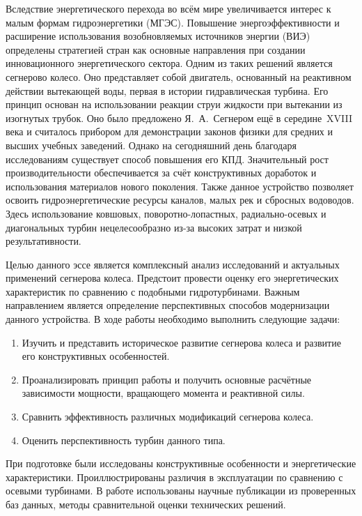 Вследствие энергетического перехода во всём мире увеличивается интерес к малым формам гидроэнергетики (МГЭС). 
Повышение энергоэффективности и расширение использования возобновляемых источников энергии (ВИЭ) определены стратегией стран
как основные направления при создании инновационного энергетического сектора. Одним из таких решений является сегнерово колесо.
Оно представляет собой двигатель, основанный на реактивном действии вытекающей воды, первая в истории гидравлическая турбина. 
Его принцип основан на использовании реакции струи жидкости при вытекании из изогнутых трубок. Оно было предложено 
Я.~А.~Сегнером ещё в середине~XVIII века и считалось прибором для демонстрации законов физики для средних и высших учебных заведений. 
Однако на сегодняшний день благодаря исследованиям существует способ повышения его КПД. Значительный рост производительности 
обеспечивается за счёт конструктивных доработок и использования материалов нового поколения. Также данное устройство позволяет 
освоить гидроэнергетические ресурсы каналов, малых рек и сбросных водоводов. Здесь использование ковшовых, поворотно-лопастных, 
радиально-осевых и диагональных турбин нецелесообразно из-за высоких затрат и низкой результативности.

Целью данного эссе является комплексный анализ исследований и актуальных применений сегнерова колеса. 
Предстоит провести оценку его энергетических характеристик по сравнению с подобными гидротурбинами. Важным направлением
является определение перспективных способов модернизации данного устройства. В ходе работы необходимо выполнить следующие
задачи:

\begin{enumerate}
    \item Изучить и представить историческое развитие сегнерова колеса и развитие его конструктивных особенностей.
    \item Проанализировать принцип работы и получить основные расчётные зависимости мощности, вращающего момента и реактивной силы.
    \item Сравнить эффективность различных модификаций сегнерова колеса.
    \item Оценить перспективность турбин данного типа.
\end{enumerate}

При подготовке были исследованы конструктивные особенности и энергетические характеристики. Проиллюстрированы различия в эксплуатации по сравнению с осевыми турбинами. В работе использованы научные публикации из проверенных баз данных, методы сравнительной оценки технических решений.